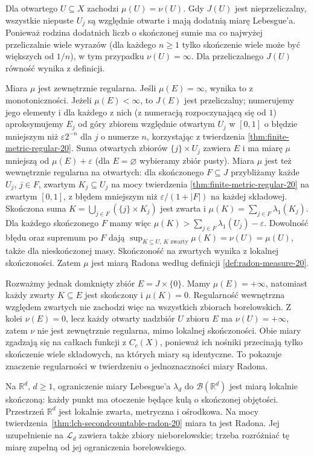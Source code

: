 \begin{przyklad}
Dla otwartego $U\subseteq X$ zachodzi $\mu(U)=\nu(U)$.
Gdy $J(U)$ jest nieprzeliczalny, wszystkie niepuste
$U_j$ są względnie otwarte i mają dodatnią miarę
Lebesgue'a. Ponieważ rodzina dodatnich liczb o skończonej
sumie ma co najwyżej przeliczalnie wiele wyrazów
(dla każdego $n\ge1$ tylko skończenie wiele może być
większych od $1/n$), w tym przypadku $\nu(U)=\infty$.
Dla przeliczalnego $J(U)$ równość wynika z definicji.

Miara $\mu$ jest zewnętrznie regularna. Jeśli
$\mu(E)=\infty$, wynika to z monotoniczności.
Jeżeli $\mu(E)<\infty$, to $J(E)$ jest przeliczalny;
numerujemy jego elementy i dla każdego z nich
(z numeracją rozpoczynającą się od $1$) aproksymujemy $E_j$ od góry zbiorem względnie otwartym
$U_j$ w $[0,1]$ o błędzie mniejszym niż
$\varepsilon2^{-n}$ dla $j$ o numerze $n$,
korzystając z twierdzenia
\ref{thm:finite-metric-regular-20}.
Suma otwartych zbiorów $\{j\}\times U_j$ zawiera $E$
i ma miarę $\mu$ mniejszą od $\mu(E)+\varepsilon$
(dla $E=\varnothing$ wybieramy zbiór pusty).
Miara $\mu$ jest też wewnętrznie regularna na otwartych:
dla skończonego $F\subseteq J$ przybliżamy każde $U_j$,
$j\in F$, zwartym $K_j\subseteq U_j$ na mocy
twierdzenia \ref{thm:finite-metric-regular-20}
na zwartym $[0,1]$, z błędem mniejszym niż
$\varepsilon/(1+|F|)$ na każdej składowej. Skończona suma
$K=\bigcup_{j\in F}(\{j\}\times K_j)$ jest zwarta
i $\mu(K)=\sum_{j\in F}\lambda_1(K_j)$.
Dla każdego skończonego $F$ mamy więc
$\mu(K)>\sum_{j\in F}\lambda_1(U_j)-\varepsilon$.
Dowolność błędu oraz supremum po $F$ dają
$\sup_{K\subseteq U,\ K\text{ zwarty}}\mu(K)
=\nu(U)=\mu(U)$, także dla nieskończonej masy.
Skończoność na zwartych wynika z lokalnej skończoności.
Zatem $\mu$ jest miarą Radona według definicji
\ref{def:radon-measure-20}.

Rozważmy jednak domknięty zbiór $E=J\times\{0\}$.
Mamy $\mu(E)=+\infty$, natomiast każdy zwarty
$K\subseteq E$ jest skończony i $\mu(K)=0$.
Regularność wewnętrzna względem zwartych nie zachodzi
więc na wszystkich zbiorach borelowskich.
Z kolei $\nu(E)=0$, lecz każdy otwarty nadzbiór $U$
zbioru $E$ ma $\nu(U)=+\infty$, zatem $\nu$ nie jest
zewnętrznie regularna, mimo lokalnej skończoności.
Obie miary zgadzają się na całkach funkcji z $C_c(X)$,
ponieważ ich nośniki przecinają tylko skończenie
wiele składowych, na których miary są identyczne.
To pokazuje znaczenie regularności w twierdzeniu
o jednoznaczności miary Radona.
\end{przyklad}

\begin{przyklad}
Na $\mathbb R^d$, $d\ge1$, ograniczenie miary Lebesgue'a
$\lambda_d$ do $\mathcal B(\mathbb R^d)$ jest miarą
lokalnie skończoną: każdy punkt ma otoczenie będące
kulą o skończonej objętości. Przestrzeń $\mathbb R^d$
jest lokalnie zwarta, metryczna i ośrodkowa.
Na mocy twierdzenia~\ref{thm:lch-secondcountable-radon-20}
miara ta jest Radona. Jej uzupełnienie na
$\mathcal L_d$ zawiera także zbiory nieborelowskie;
trzeba rozróżniać tę miarę zupełną od jej ograniczenia
borelowskiego.
\end{przyklad}

